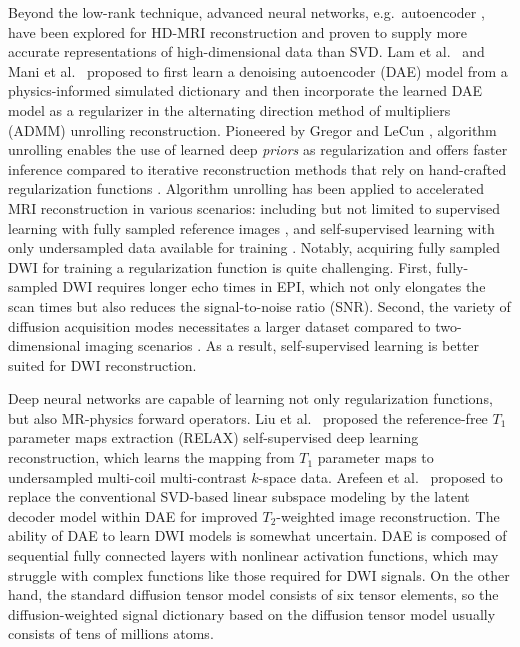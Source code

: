 \documentclass[journal,twoside,web]{ieeecolor}
\begin{document}
	Beyond the low-rank technique,
	advanced neural networks, e.g.~autoencoder \cite{hinton_2006_ae},
	have been explored for HD-MRI reconstruction and
	proven to supply more accurate representations of
	high-dimensional data than SVD.
	Lam et al.~\cite{lam_2019_mrsi} and Mani et al.~\cite{mani_2021_qmodel}
	proposed to first learn a denoising autoencoder (DAE) model
	from a physics-informed simulated dictionary
	and then incorporate the learned DAE model as a regularizer
	in the alternating direction method of multipliers (ADMM)
	\cite{boyd_2010_admm}
	unrolling reconstruction.
	Pioneered by Gregor and LeCun \cite{gregor_2010_algunroll},
	algorithm unrolling enables the use of learned deep \textit{priors}
	as regularization and offers faster inference compared to
	iterative reconstruction methods that rely on hand-crafted regularization functions
	\cite{monga_2021_algunroll}.
	Algorithm unrolling has been applied to
	accelerated MRI reconstruction in various scenarios:
	including but not limited to
	supervised learning with fully sampled reference images
	\cite{hammernik_2018_varnet,aggarwal_2018_modl},
	and self-supervised learning
	with only undersampled data available for training
	\cite{yaman_2020_ssdu,yaman_2022_zs}.
	Notably, acquiring fully sampled DWI
	for training a regularization function is quite challenging.
	First, fully-sampled DWI requires longer echo times in EPI,
	which not only elongates the scan times
	but also reduces the signal-to-noise ratio (SNR).
	Second, the variety of diffusion acquisition modes necessitates
	a larger dataset compared to two-dimensional imaging scenarios
	\cite{knoll_2020_fastmri}.
	As a result, self-supervised learning is better suited
	for DWI reconstruction.

	Deep neural networks are capable of learning
	not only regularization functions,
	but also MR-physics forward operators.
	Liu et al.~\cite{liu_2021_relax} proposed
	the reference-free $T_1$ parameter maps extraction (RELAX)
	self-supervised deep learning reconstruction,
	which learns the mapping from $T_1$ parameter maps to
	undersampled multi-coil multi-contrast $k$-space data.
	Arefeen et al.~\cite{arefeen_2023_latent} proposed
	to replace the conventional SVD-based linear subspace modeling
	\cite{huang_2012_t2basis}
	by the latent decoder model within DAE
	for improved $T_2$-weighted image reconstruction.
	The ability of DAE to learn DWI models is somewhat uncertain.
	DAE is composed of sequential fully connected layers
	with nonlinear activation functions,
	which may struggle with complex functions like those required for DWI signals.
	On the other hand, 
	the standard diffusion tensor model \cite{basser_1994_dmri}
	consists of six tensor elements,
	so the diffusion-weighted signal dictionary 
	based on the diffusion tensor model 
	usually consists of tens of millions atoms.
\end{document}
